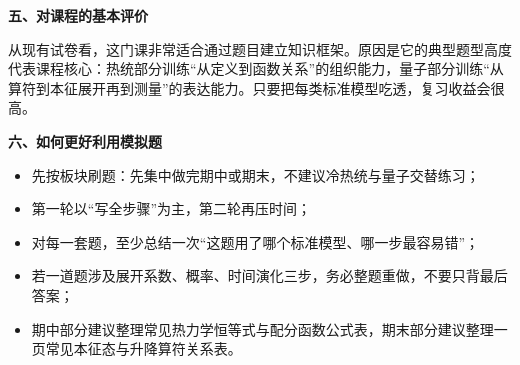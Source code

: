 \textbf{五、对课程的基本评价}

从现有试卷看，这门课非常适合通过题目建立知识框架。原因是它的典型题型高度代表课程核心：热统部分训练“从定义到函数关系”的组织能力，量子部分训练“从算符到本征展开再到测量”的表达能力。只要把每类标准模型吃透，复习收益会很高。

\textbf{六、如何更好利用模拟题}
\begin{itemize}[leftmargin=2em,itemsep=0.2em,topsep=0.2em]
  \item 先按板块刷题：先集中做完期中或期末，不建议冷热统与量子交替练习；
  \item 第一轮以“写全步骤”为主，第二轮再压时间；
  \item 对每一套题，至少总结一次“这题用了哪个标准模型、哪一步最容易错”；
  \item 若一道题涉及展开系数、概率、时间演化三步，务必整题重做，不要只背最后答案；
  \item 期中部分建议整理常见热力学恒等式与配分函数公式表，期末部分建议整理一页常见本征态与升降算符关系表。
\end{itemize}


